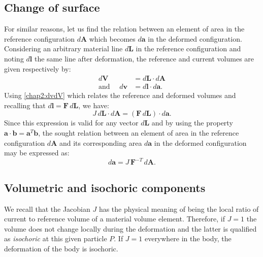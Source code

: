 	\subsection{Change of surface}
For similar reasons, let us find the relation between an element of area in the reference configuration $d\mathbf{A}$ which becomes $d\mathbf{a}$ in the deformed configuration. Considering an arbitrary material line $d\mathbf{L}$ in the reference configuration and noting $d\mathbf{l}$ the same line after deformation, the reference and current volumes are given respectively by:
\begin{align}
d\mathbf{V} &= d\mathbf{L} \cdot d\mathbf{A} \\
\mbox{and } \quad d\mathbf{v} &= d\mathbf{l} \cdot d\mathbf{a}.
\end{align}
Using \eqref{chap2:dvdV} which relates the reference and deformed volumes and recalling that $d\mathbf{l} = \mathbf{F} \, d\mathbf{L}$, we have:
\begin{equation}
J \, d\mathbf{L} \cdot d\mathbf{A} = (\mathbf{F} \, d\mathbf{L}) \cdot d\mathbf{a}.
\end{equation}
\ON Since \OFF this expression is valid for any vector $d\mathbf{L}$ and by using the property $\mathbf{a} \cdot \mathbf{b} = \mathbf{a} ^{T} \mathbf{b}$, \ON the sought relation between an element of area in the reference configuration $d\mathbf{A}$ and its corresponding area $d\mathbf{a}$ in the deformed configuration may be expressed as: \OFF
\begin{equation}
\label{chap2:dadA}
d\mathbf{a} = J \, \mathbf{F}^{-T} \, d\mathbf{A}.
\end{equation}
% 
			
	\subsection{Volumetric and isochoric components}
We recall that the Jacobian $J$ has the physical meaning of being the local ratio of current to reference volume of a material volume element. Therefore, if $J = 1$ the volume does not change locally during the deformation and the latter is qualified as \emph{isochoric} at this given particle $P$. If $J = 1$ everywhere in the body, the deformation of the body is isochoric. 

